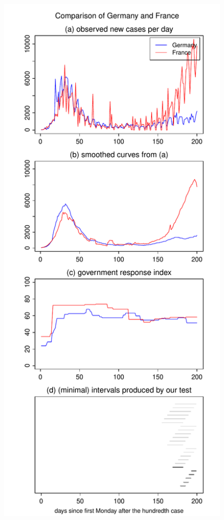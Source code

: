 \documentclass[a4paper,12pt]{article}
\numberwithin{equation}{section}
\begin{document}
{\begin{figure}[h!]
\begin{minipage}[t]{0.49\textwidth}
\includegraphics[width=\textwidth]{plots/DEU_vs_FRA_long}

\end{minipage}
\end{figure}}
\end{document}
